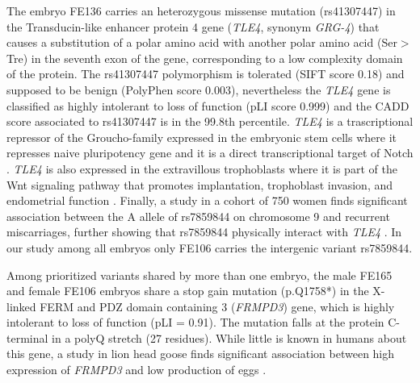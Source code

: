 The embryo FE136 carries an heterozygous missense mutation (rs41307447) in the Transducin-like enhancer protein 4 gene (\textit{TLE4}, synonym \textit{GRG-4}) that causes a substitution of a polar amino acid with another polar amino acid (Ser$>$Tre) in the seventh exon of the gene, corresponding to a low complexity domain of the protein. The rs41307447 polymorphism is tolerated (SIFT score 0.18) and supposed to be benign (PolyPhen score 0.003), nevertheless the \textit{TLE4} gene is classified as highly intolerant to loss of function (pLI score 0.999) and the CADD score associated to rs41307447 is in the 99.8th percentile. 
\textit{TLE4} is a trascriptional repressor of the Groucho-family expressed in the embryonic stem cells where it represses naive pluripotency gene \cite{laing2015gro} and it is a direct transcriptional target of Notch \cite{menchero2019transitions}. \textit{TLE4} is also expressed in the extravillous trophoblasts \cite{meinhardt2014wnt} where it is part of the Wnt signaling pathway that promotes implantation, trophoblast invasion, and endometrial function \cite{sonderegger2010wnt}. Finally, a study in a cohort of 750 women finds significant association between the A allele of rs7859844 on chromosome 9 and recurrent miscarriages, further showing that rs7859844 physically interact with \textit{TLE4} \cite{laisk2020genetic}. In our study among all embryos only FE106 carries the intergenic variant rs7859844. 

Among prioritized variants shared by more than one embryo, the male FE165 and female FE106 embryos share a stop gain mutation (p.Q1758*) in the X-linked FERM and PDZ domain containing 3 (\textit{FRMPD3}) gene, which is highly intolerant to loss of function (pLI = 0.91). The mutation falls at the protein C-terminal in a polyQ stretch (27 residues). While little is known in humans about this gene, a study in lion head goose finds significant association between high expression of \textit{FRMPD3} and low production of eggs \cite{zhao2020genome}. 


